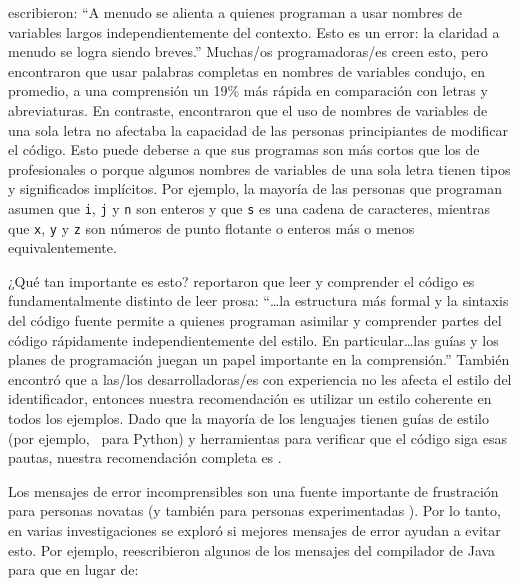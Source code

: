 \cite{Kern1999} escribieron:
``A menudo se alienta a quienes programan a usar nombres de variables largos independientemente del contexto.
Esto es un error: la claridad a menudo se logra siendo breves.''
Muchas/os programadoras/es creen esto,
pero \cite{Hofm2017} encontraron que usar palabras completas en nombres de variables
 condujo, en promedio, a una comprensión un 19\% más rápida en comparación con letras y abreviaturas.
En contraste,
\cite{Beni2017} encontraron que el uso de nombres de variables de una sola letra no afectaba la capacidad de las personas principiantes de modificar el código.
Esto puede deberse a que sus programas son más cortos que los de profesionales
o porque algunos nombres de variables de una sola letra tienen tipos y significados implícitos.
Por ejemplo,
la mayoría de las personas que programan asumen que \texttt{i}, \texttt{j} y \texttt{n} son enteros
y que \texttt{s} es una cadena de caracteres,
mientras que \texttt{x}, \texttt{y} y \texttt{z} son números de punto flotante o enteros
más o menos equivalentemente.

¿Qué tan importante es esto?
\cite{Bink2012} reportaron que leer y comprender el código es fundamentalmente distinto de leer prosa:
``{\ldots}la estructura más formal y la sintaxis del código fuente
permite a quienes programan asimilar y comprender partes del código rápidamente independientemente del estilo.
En particular{\ldots}las guías y los planes de programación juegan un papel importante en la comprensión.''
También encontró que a las/los desarrolladoras/es con experiencia no les afecta el estilo del identificador,
entonces nuestra recomendación es utilizar un estilo coherente en todos los ejemplos.
Dado que la mayoría de los lenguajes tienen guías de estilo
(por ejemplo,\  para Python)
y herramientas para verificar que el código siga esas pautas,
nuestra recomendación completa es
.


Los mensajes de error incomprensibles son una fuente importante de frustración para personas novatas
(y también para personas experimentadas ).
Por lo tanto, en varias investigaciones se exploró si mejores mensajes de error ayudan a evitar esto.
Por ejemplo,
\cite{Beck2016} reescribieron algunos de los mensajes del compilador de Java para que en lugar de:

